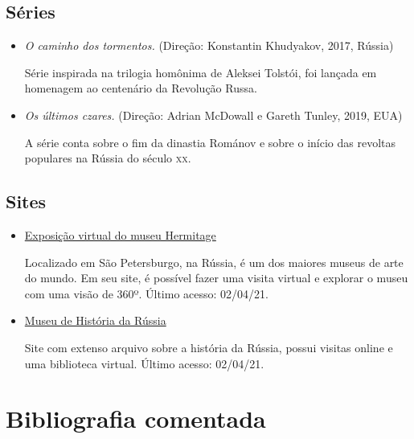 \documentclass[11pt]{extarticle}
\begin{document}
\subsection{Séries}

\begin{itemize}

\item \emph{O caminho dos tormentos.} (Direção: Konstantin Khudyakov, 2017, Rússia)

Série inspirada na trilogia homônima de Aleksei Tolstói, foi lançada em homenagem ao centenário
da Revolução Russa.

\item \emph{Os últimos czares.} (Direção: Adrian McDowall e Gareth Tunley, 2019, EUA)

A série conta sobre o fim da dinastia Románov e sobre o início das revoltas populares na Rússia do século \textsc{xx}.

\end{itemize}

\subsection{Sites}

\begin{itemize}

\item \href{https://www.hermitagemuseum.org/wps/portal/hermitage/panorama/virtual_visit/panoramas-m-1?lng=en}{Exposição virtual do museu Hermitage}

Localizado em São Petersburgo, na Rússia, é um dos maiores museus de arte do mundo. Em seu site, é possível fazer uma visita virtual e explorar o museu com uma visão de 360º. Último acesso: 02/04/21.

\item \href{https://www.russianhistorymuseum.org/}{Museu de História da Rússia}

Site com extenso arquivo sobre a história da Rússia, possui visitas online e uma biblioteca virtual. Último acesso: 02/04/21.
\end{itemize}

\section{Bibliografia comentada}
\end{document}
